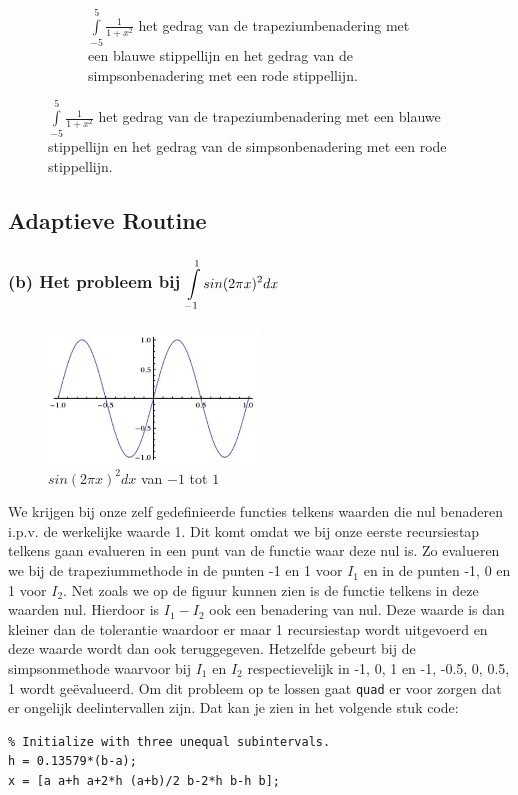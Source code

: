\documentclass[11pt,a4paper]{article}
\begin{document}
\begin{figure}[H]
\begin{subfigure}{0.5\textwidth}
	\caption*{$\int\limits_{-5}^5\frac{1}{1+x^2}$ het gedrag van de trapeziumbenadering met een blauwe stippellijn en het gedrag van de simpsonbenadering met een rode stippellijn.}
	\end{subfigure}

\end{figure}

\subsection{Adaptieve Routine}

\subsubsection*{(b) Het probleem bij $\mathop{\mathlarger{\int\limits_{-1}^1sin(2\pi x)^2dx}}$}

\begin{figure}
	\begin{center}
	\vspace{-85pt}
	\includegraphics[width=0.5\textwidth]{12b.png}
	\caption*{$sin(2\pi x)^2dx$ van $-1$ tot $1$}
	\vspace{-25pt}
	\end{center}
	\end{figure}
We krijgen bij onze zelf gedefinieerde functies telkens waarden die nul benaderen i.p.v. de werkelijke waarde 1. Dit komt omdat we bij onze eerste recursiestap telkens gaan evalueren in een punt van de functie waar deze nul is. Zo evalueren we bij de trapeziummethode in de punten -1 en 1 voor $I_1$ en in de punten -1, 0 en 1 voor $I_2$. Net zoals we op de figuur kunnen zien is de functie telkens in deze waarden nul. Hierdoor is $I_1 - I_2$ ook een benadering van nul. Deze waarde is dan kleiner dan de tolerantie waardoor er maar 1 recursiestap wordt uitgevoerd en deze waarde wordt dan ook teruggegeven. Hetzelfde gebeurt bij de simpsonmethode waarvoor bij $I_1$ en $I_2$ respectievelijk in -1, 0, 1 en -1, -0.5, 0, 0.5, 1 wordt ge\"evalueerd. Om dit probleem op te lossen gaat \verb|quad| er voor zorgen dat er ongelijk deelintervallen zijn. Dat kan je zien in het volgende stuk code:
\begin{verbatim}
% Initialize with three unequal subintervals.
h = 0.13579*(b-a);
x = [a a+h a+2*h (a+b)/2 b-2*h b-h b];
\end{verbatim}
\end{document}
